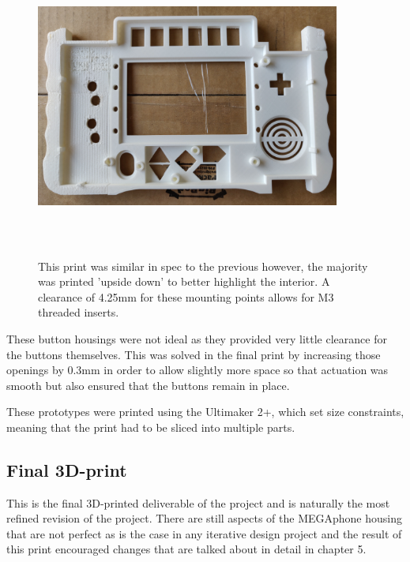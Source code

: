 \begin{figure} [h]
    \centering
    \includegraphics[width=10cm,height=10cm,keepaspectratio]{Figures/secondtothirdprint.png}
    \caption{This print was similar in spec to the previous however, the majority was printed 'upside down' to better highlight the interior. A clearance of 4.25mm for these mounting points allows for M3 threaded inserts.}
    \label{fig:Secondtothird}
\end{figure}

These button housings were not ideal as they provided very little clearance for the buttons themselves.
This was solved in the final print by increasing those openings by 0.3mm in order to allow slightly more space so that actuation was smooth but also ensured that the buttons remain in place.

These prototypes were printed using the Ultimaker 2+, which set size constraints, meaning that the print had to be sliced into multiple parts.

\subsection{Final 3D-print}

This is the final 3D-printed deliverable of the project and is naturally the most refined revision of the project. 
There are still aspects of the MEGAphone housing that are not perfect as is the case in any iterative design project and the result of this print encouraged changes that are talked about in detail in chapter 5.

